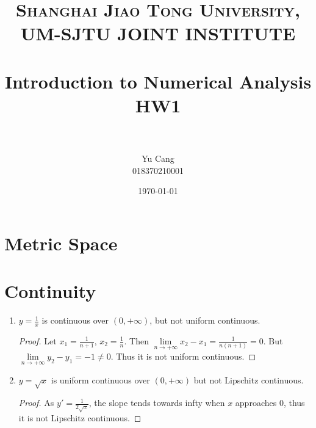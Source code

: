 \documentclass[paper=a4, fontsize=11pt]{scrartcl} %
\title{	
\normalfont \normalsize 
\textsc{Shanghai Jiao Tong University, UM-SJTU JOINT INSTITUTE} \\ [25pt] %
\horrule{0.5pt} \\[0.4cm] %
\huge Introduction to Numerical Analysis \\ HW1 \\ %
\horrule{2pt} \\[0.5cm] %
}
\author{Yu Cang \\ 018370210001} %
\date{\normalsize\today} %
\numberwithin{equation}{section} %
\numberwithin{figure}{section} %
\numberwithin{table}{section} %
\begin{document}
\maketitle %


\section{Metric Space}



\section{Continuity}

\begin{enumerate}
\item $y=\frac{1}{x}$ is continuous over $(0, +\infty)$, but not uniform continuous.
      \begin{proof}
      	Let $x_1 = \frac{1}{n+1}$,  $x_2 = \frac{1}{n}$. 
      	Then $\lim\limits_{n \rightarrow +\infty} x_2-x_1 = \frac{1}{n(n+1)} = 0 $.
      	But $\lim\limits_{n \rightarrow +\infty} y_2- y_1 = -1 \neq 0 $.
      	Thus it is not uniform continuous.
      \end{proof}
\item $y=\sqrt{x}$ is uniform continuous over $(0, +\infty)$ but not Lipschitz continuous.
	  \begin{proof}
	  	As $y\prime = \frac{1}{2\sqrt{x}}$, 
	  	the slope tends towards infty when $x$ approaches 0, 
	  	thus it is not Lipschitz continuous.  
	  \end{proof}
\end{enumerate}


\end{document}

